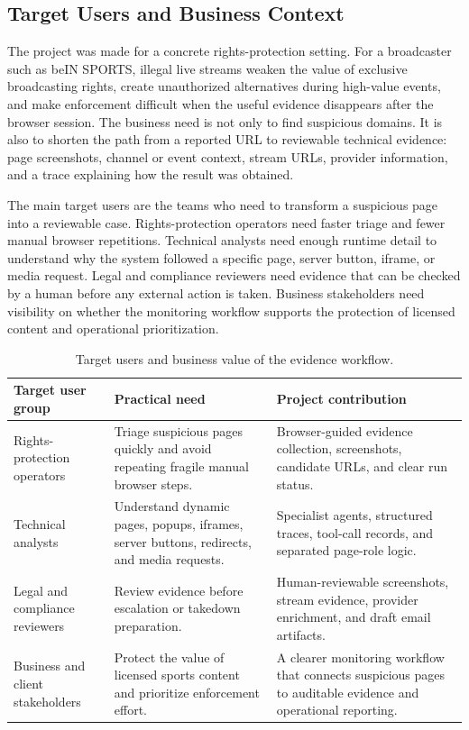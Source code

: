 \subsection{Target Users and Business Context}

The project was made for a concrete rights-protection setting. For a broadcaster
such as beIN SPORTS, illegal live streams weaken the value of exclusive broadcasting
rights, create unauthorized alternatives during high-value events, and make
enforcement difficult when the useful evidence disappears after the browser session.
The business need is not only to find suspicious domains. It is also to shorten the
path from a reported URL to reviewable technical evidence: page screenshots,
channel or event context, stream URLs, provider information, and a trace explaining
how the result was obtained.

The main target users are the teams who need to transform a suspicious page into a
reviewable case. Rights-protection operators need faster triage and fewer manual
browser repetitions. Technical analysts need enough runtime detail to understand why
the system followed a specific page, server button, iframe, or media request.
Legal and compliance reviewers need evidence that can be checked by a human before
any external action is taken. Business stakeholders need visibility on whether the
monitoring workflow supports the protection of licensed content and operational
prioritization.

\begin{table}[!htbp]
\centering
\small
\begin{tabularx}{\textwidth}{Q{3.15cm} Y Y}
\toprule
{}
Target user group & Practical need & Project contribution \\
\midrule
Rights-protection operators &
Triage suspicious pages quickly and avoid repeating fragile manual browser steps. &
Browser-guided evidence collection, screenshots, candidate URLs, and clear run
status. \\
Technical analysts &
Understand dynamic pages, popups, iframes, server buttons, redirects, and media
requests. &
Specialist agents, structured traces, tool-call records, and separated page-role
logic. \\
Legal and compliance reviewers &
Review evidence before escalation or takedown preparation. &
Human-reviewable screenshots, stream evidence, provider enrichment, and draft email
artifacts. \\
Business and client stakeholders &
Protect the value of licensed sports content and prioritize enforcement effort. &
A clearer monitoring workflow that connects suspicious pages to auditable evidence
and operational reporting. \\
\bottomrule
\end{tabularx}
\caption{Target users and business value of the evidence workflow.}
\label{tab:intro-target-users}
\end{table}

